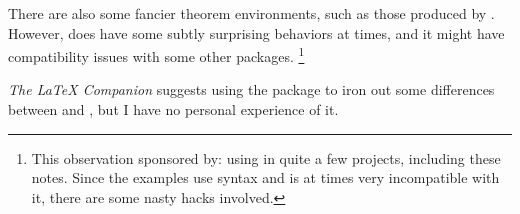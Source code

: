 There are also some fancier theorem environments,
such as those produced by .
However,  does have some subtly surprising behaviors at times,
and it might have compatibility issues with some other packages.%
\footnote{This observation sponsored by: using  in quite a few projects,
including these notes.
Since the examples use  syntax and  is at times very incompatible with it,
there are some nasty hacks involved.}

\emph{The \LaTeX{} Companion} \cite[Section~4.1.5]{TLC} suggests using the 
package to iron out some differences between  and ,
but I have no personal experience of it.

